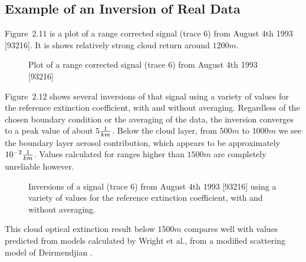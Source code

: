 \subsection{Example of an Inversion of Real Data}

Figure~{2.11} is a plot of a range corrected signal (trace 6) from 
August 4th 1993 [93216]. It is shows relatively strong cloud return
around $1200 m$.

\begin{figure}
\vspace{5.0in}
\caption{Plot of a range corrected signal (trace 6) from 
August 4th 1993 [93216]}
\end{figure}

Figure~{2.12} shows several inversions of that signal using
a variety of values for the reference extinction coefficient,
with and without averaging. Regardless of the chosen boundary condition
or the averaging of the data, the inversion converges to 
a peak value of about $5{1\over{km}}$. Below the cloud layer,
from $500 m$ to $1000 m$ we see the boundary layer
aerosol contribution, which appears to be 
approximately $10^{-2}{1\over{km}}$. Values calculated for ranges
higher than $1500m$ are completely unreliable however.

\begin{figure}
\vspace{5.0in}
\caption{Inversions of a signal (trace 6) from 
August 4th 1993 [93216] using a variety of values 
for the reference extinction coefficient,
with and without averaging.}
\end{figure}

This cloud optical extinction result below $1500m$ compares well with
values predicted from models calculated by Wright et al.,
from a modified scattering model of Deirmendjian
\cite{rmm}.

